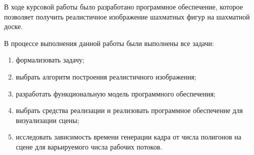 
В ходе курсовой работы было разработано программное обеспечение, которое позволяет получить реалистичное изображение шахматных фигур на шахматной доске. 

В процессе выполнения данной работы были выполнены все задачи:
\begin{enumerate}
	\item формализовать задачу;
	\item выбрать алгоритм построения реалистичного изображения;
	\item разработать функциональную модель программного обеспечения;
	\item выбрать средства реализации и реализовать программное обеспечение для визуализации сцены;
	\item исследовать зависимость времени генерации кадра от числа полигонов на сцене для варьируемого числа рабочих потоков.
\end{enumerate}
